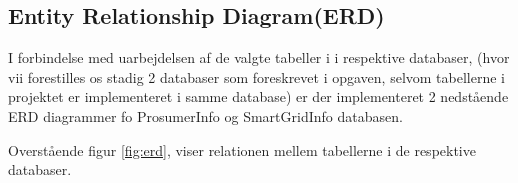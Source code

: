 
\subsection{Entity Relationship Diagram(ERD)}

I forbindelse med uarbejdelsen af de valgte tabeller i i respektive databaser, 
(hvor vii forestilles os stadig 2 databaser som foreskrevet i opgaven, selvom tabellerne i projektet er implementeret i samme database)
er der implementeret 2 nedstående ERD diagrammer fo ProsumerInfo og SmartGridInfo databasen.


Overstående figur \ref{fig:erd}, viser relationen mellem tabellerne i de respektive databaser.

